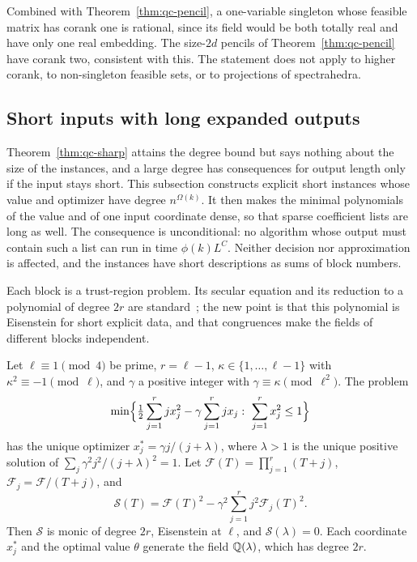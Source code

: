 Combined with Theorem~\ref{thm:qc-pencil}, a one-variable singleton whose
feasible matrix has corank one is rational, since its field would be both
totally real and have only one real embedding. The size-$2d$ pencils of
Theorem~\ref{thm:qc-pencil} have corank two, consistent with this. The
statement does not apply to higher corank, to non-singleton feasible sets, or
to projections of spectrahedra.

\subsection{Short inputs with long expanded outputs}
\label{app:qc-short}

Theorem~\ref{thm:qc-sharp} attains the degree bound but says nothing about
the size of the instances, and a large degree has consequences for output
length only if the input stays short. This subsection constructs explicit
short instances whose value and optimizer have degree $n^{\Omega(k)}$. It then
makes the minimal polynomials of the value and of one input coordinate dense,
so that sparse coefficient lists are long as well. The consequence is
unconditional: no algorithm whose output must contain such a list can run in
time $\phi(k)L^C$. Neither decision nor approximation is affected, and
the instances have short descriptions as sums of block numbers.

Each block is a trust-region problem. Its secular equation and its
reduction to a polynomial of degree $2r$ are standard~\cite{AdachiIwataNakatsukasaTakeda2017};
the new point is that this polynomial is Eisenstein for short explicit data,
and that congruences make the fields of different blocks independent.

\begin{proposition}
\label{prop:qc-block}
Let $\ell\equiv1\pmod4$ be prime, $r=\ell-1$, $\kappa\in\{1,\ldots,\ell-1\}$
with $\kappa^2\equiv-1\pmod\ell$, and $\gamma$ a positive integer with
$\gamma\equiv\kappa\pmod{\ell^2}$. The problem
\begin{equation}
\label{eq:qc-block}
\min\Bigl\{\tfrac12\sum_{j=1}^rjx_j^2-\gamma\sum_{j=1}^rjx_j:\
\sum_{j=1}^rx_j^2\le1\Bigr\}
\end{equation}
has the unique optimizer $x_j^*=\gamma j/(j+\lambda)$, where $\lambda>1$ is
the unique positive solution of $\sum_j\gamma^2j^2/(j+\lambda)^2=1$. Let
$\mathcal F(T)=\prod_{j=1}^r(T+j)$, $\mathcal F_j=\mathcal F/(T+j)$, and
\[
\mathcal S(T)=\mathcal F(T)^2-\gamma^2\sum_{j=1}^rj^2\mathcal F_j(T)^2 .
\]
Then $\mathcal S$ is monic of degree $2r$, Eisenstein at $\ell$, and
$\mathcal S(\lambda)=0$. Each coordinate $x_j^*$ and the optimal value
$\theta$ generate the field $\mathbb Q(\lambda)$, which has degree $2r$.
\end{proposition}

